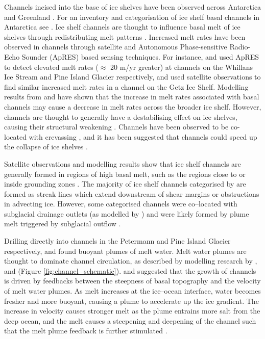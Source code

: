 Channels incised into the base of ice shelves have been observed across Antarctica and Greenland \citep[e.g.][]{alley2016impacts,washam2019summer}. For an inventory and categorisation of ice shelf basal channels in Antarctica see \cite{alley2016impacts}.
Ice shelf channels are thought to influence basal melt of ice shelves through redistributing melt patterns \citep{millgate2013effect}. 
Increased melt rates have been observed in channels through satellite and Autonomous Phase-sensitive Radio-Echo Sounder (ApRES) based sensing techniques. For instance, \cite{marsh2016high} and \cite{stanton2013channelized} used ApRES to detect elevated melt rates ($\approx$ 20 m/yr greater) at channels on the Whillans Ice Stream and Pine Island Glacier respectively, and \cite{chartrand2020basal}  used satellite observations to find similar increased melt rates in a channel on the Getz Ice Shelf.
Modelling results from \cite{gladish2012ice} and \cite{millgate2013effect} have shown that the increase in melt rates associated with basal channels may cause a decrease in melt rates across the broader ice shelf.
However, channels are thought to generally have a destabilising effect on ice shelves, causing their structural weakening \citep{alley2019troughs}. Channels have been observed to be co-located with crevassing \citep{stanton2013channelized,alley2016impacts}, and it has been suggested that channels could speed up the collapse of ice shelves \cite{rignot2008channelized}. 

Satellite observations \citep{rignot2008recent} and modelling results  \citep{sergienko2013basal} show that ice shelf channels are generally formed in regions of high basal melt, such as the regions close to or inside grounding zones \citep{alley2016impacts}.
The majority of ice shelf channels categorised by \cite{alley2016impacts} are formed as streak lines which extend downstream of shear margins or obstructions in advecting ice.  However, some categorised channels were co--located with subglacial drainage outlets (as modelled by \cite{le2013evidence}) and were likely formed by plume melt triggered by subglacial outflow \citep{alley2016impacts}.

Drilling directly into channels in the Petermann and Pine Island Glacier respectively, \cite{rignot2008channelized} and \cite{stanton2013channelized} found buoyant plumes of melt water. Melt water plumes are thought to dominate channel circulation,  as described by modelling research by \cite{jenkins2011convection}, \cite{ sergienko2013basal} and \cite{gladish2012ice} (Figure \ref{fig:channel_schematic}). \cite{ sergienko2013basal} and \cite{gladish2012ice} suggested that the growth of channels is driven by feedbacks between the steepness of basal topography and the velocity of melt water plumes. As melt increases at the ice--ocean interface, water becomes fresher and more buoyant, causing a plume to accelerate up the ice gradient. The increase in velocity causes stronger melt as the plume entrains more salt from the deep ocean, and the melt causes a steepening and deepening of the channel such that the melt plume feedback is further stimulated \citep{sergienko2013basal}.


